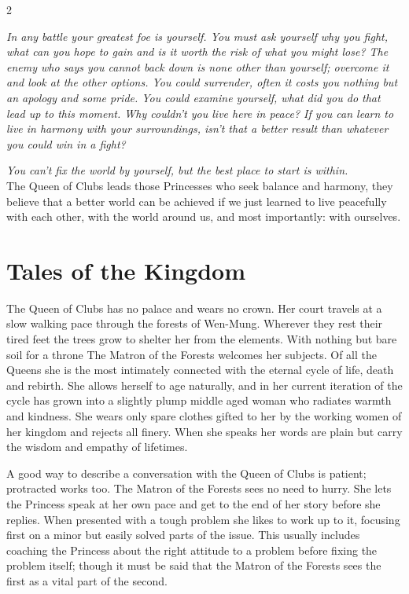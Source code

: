 \label{scha:Clubs}\begin{multicols}{2}\raggedcolumns

\noindent \textit{In any battle your greatest foe is yourself. You must ask yourself why you fight, what can you hope to gain and is it worth the risk of what you might lose? The enemy who says you cannot back down is none other than yourself; overcome it and look at the other options. You could surrender, often it costs you nothing but an apology and some pride. You could examine yourself, what did you do that lead up to this moment. Why couldn't you live here in peace? If you can learn to live in harmony with your surroundings, isn't that a better result than whatever you could win in a fight?}

\textit{You can't fix the world by yourself, but the best place to start is within.}\\

\noindent The Queen of Clubs leads those Princesses who seek balance and harmony, they believe that a better world can be achieved if we just learned to live peacefully with each other, with the world around us, and most importantly: with ourselves. 

\section*{Tales of the Kingdom}
The Queen of Clubs has no palace and wears no crown. Her court travels at a slow walking pace through the forests of Wen-Mung. Wherever they rest their tired feet the trees grow to shelter her from the elements. With nothing but bare soil for a throne The Matron of the Forests welcomes her subjects. Of all the Queens she is the most intimately connected with the eternal cycle of life, death and rebirth. She allows herself to age naturally, and in her current iteration of the cycle has grown into a slightly plump middle aged woman who radiates warmth and kindness. She wears only spare clothes gifted to her by the working women of her kingdom and rejects all finery. When she speaks her words are plain but carry the wisdom and empathy of lifetimes.

A good way to describe a conversation with the Queen of Clubs is patient; protracted works too. The Matron of the Forests sees no need to hurry. She lets the Princess speak at her own pace and get to the end of her story before she replies. When presented with a tough problem she likes to work up to it, focusing first on a minor but easily solved parts of the issue. This usually includes coaching the Princess about the right attitude to a problem before fixing the problem itself; though it must be said that the Matron of the Forests sees the first as a vital part of the second. 


\end{multicols}
